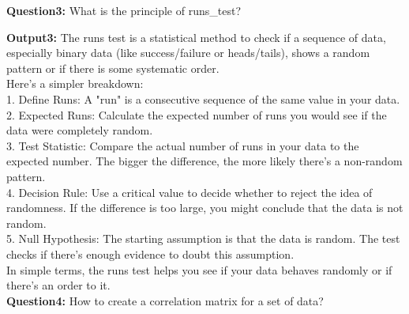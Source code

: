 \documentclass[UTF8]{ctexart} %
\begin{document}
\vspace*{2ex}
\textbf{Question3:}
What is the principle of runs\_test?

\textbf{Output3:}
The runs test is a statistical method to check if a sequence of data, especially binary data (like success/failure or heads/tails), shows a random pattern or if there is some 
systematic order.\\
Here's a simpler breakdown:\\
1.	Define Runs: A "run" is a consecutive sequence of the same value in your data.\\
2.	Expected Runs: Calculate the expected number of runs you would see if the data were completely random.\\
3.	Test Statistic: Compare the actual number of runs in your data to the expected number. The bigger the difference, the more likely there's a non-random pattern.\\
4.	Decision Rule: Use a critical value to decide whether to reject the idea of randomness. If the difference is too large, you might conclude that the data is not random.\\
5.	Null Hypothesis: The starting assumption is that the data is random. The test checks if there's enough evidence to doubt this assumption.\\
In simple terms, the runs test helps you see if your data behaves randomly or if there's an order to it.\\

\vspace*{2ex}
\textbf{Question4:}
How to create a correlation matrix for a set of data?
\end{document}
